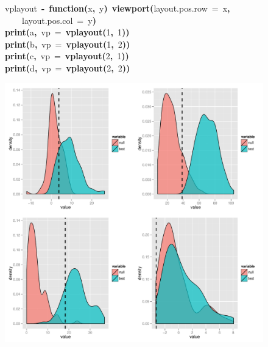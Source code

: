 \documentclass{elsarticle}
\makeatletter
\newcommand{\hlnumber}[1]{\textcolor[rgb]{0,0,0}{#1}}%
\newcommand{\hlfunctioncall}[1]{\textcolor[rgb]{.5,0,.33}{\textbf{#1}}}%
\newcommand{\hlkeyword}[1]{\textbf{#1}}%
\newcommand{\hlargument}[1]{\textcolor[rgb]{.69,.25,.02}{#1}}%
\newcommand{\hlformalargs}[1]{\hlargument{#1}}%
\newcommand{\hlassignement}[1]{\textbf{#1}}%
\newcommand{\hlsymbol}[1]{#1}%
\newcommand{\hlstd}[1]{\textcolor[rgb]{0,0,0}{#1}}%
\newenvironment{kframe}{%
 \def\FrameCommand##1{\hskip\@totalleftmargin \hskip-\fboxsep
 \colorbox{shadecolor}{##1}\hskip-\fboxsep
     \hskip-\linewidth \hskip-\@totalleftmargin \hskip\columnwidth}%
 \MakeFramed {\advance\hsize-\width
   \@totalleftmargin\z@ \linewidth\hsize
   \@setminipage}}%
 {\par\unskip\endMakeFramed}
\newenvironment{knitrout}{}{} %
\makeatother
\begin{document}
\begin{figure}
\begin{center}
\begin{knitrout}
\begin{kframe}
\begin{flushleft}
\hlstd{}\hlsymbol{vplayout}{\ }\hlassignement{\usebox{\hlnormalsizeboxlessthan}-}{\ }\hlkeyword{function}\hlkeyword{(}\hlformalargs{x}\hlkeyword{,}{\ }\hlformalargs{y}\hlkeyword{)}{\ }\hlfunctioncall{viewport}\hlkeyword{(}\hlargument{layout.pos.row}{\ }\hlargument{=}{\ }\hlsymbol{x}\hlkeyword{,}\hspace*{\fill}\\
\hlstd{}{\ }{\ }{\ }{\ }\hlargument{layout.pos.col}{\ }\hlargument{=}{\ }\hlsymbol{y}\hlkeyword{)}\hspace*{\fill}\\
\hlstd{}\hlfunctioncall{print}\hlkeyword{(}\hlsymbol{a}\hlkeyword{,}{\ }\hlargument{vp}{\ }\hlargument{=}{\ }\hlfunctioncall{vplayout}\hlkeyword{(}\hlnumber{1}\hlkeyword{,}{\ }\hlnumber{1}\hlkeyword{)}\hlkeyword{)}\hspace*{\fill}\\
\hlstd{}\hlfunctioncall{print}\hlkeyword{(}\hlsymbol{b}\hlkeyword{,}{\ }\hlargument{vp}{\ }\hlargument{=}{\ }\hlfunctioncall{vplayout}\hlkeyword{(}\hlnumber{1}\hlkeyword{,}{\ }\hlnumber{2}\hlkeyword{)}\hlkeyword{)}\hspace*{\fill}\\
\hlstd{}\hlfunctioncall{print}\hlkeyword{(}\hlsymbol{c}\hlkeyword{,}{\ }\hlargument{vp}{\ }\hlargument{=}{\ }\hlfunctioncall{vplayout}\hlkeyword{(}\hlnumber{2}\hlkeyword{,}{\ }\hlnumber{1}\hlkeyword{)}\hlkeyword{)}\hspace*{\fill}\\
\hlstd{}\hlfunctioncall{print}\hlkeyword{(}\hlsymbol{d}\hlkeyword{,}{\ }\hlargument{vp}{\ }\hlargument{=}{\ }\hlfunctioncall{vplayout}\hlkeyword{(}\hlnumber{2}\hlkeyword{,}{\ }\hlnumber{2}\hlkeyword{)}\hlkeyword{)}\mbox{}
\normalfont
\end{flushleft}


{\centering \includegraphics{plot_anoles} 

}
\end{kframe}
\end{knitrout}
\end{center}
\end{figure}
\end{document}
